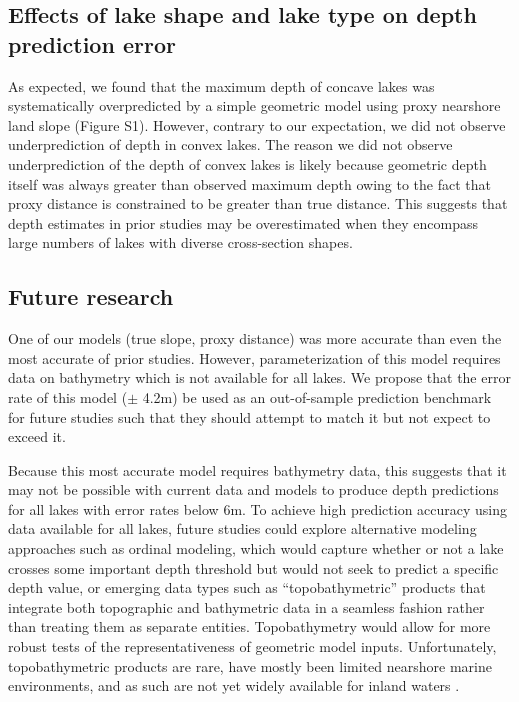 \documentclass[draft]{agujournal2019}
\begin{document}
\subsection{Effects of lake shape and lake type on depth prediction error}
\noindent
As expected, we found that the maximum depth of concave lakes was systematically overpredicted by a simple geometric model using proxy nearshore land slope (Figure S1). However, contrary to our expectation, we did not observe underprediction of depth in convex lakes. The reason we did not observe underprediction of the depth of convex lakes is likely because geometric depth itself was always greater than observed maximum depth owing to the fact that proxy distance is constrained to be greater than true distance. This suggests that depth estimates in prior studies may be overestimated when they encompass large numbers of lakes with diverse cross-section shapes.

\subsection{Future research}
\noindent
One of our models (true slope, proxy distance) was more accurate than even the most accurate of prior studies. However, parameterization of this model requires data on bathymetry which is not available for all lakes. We propose that the error rate of this model ($\pm$ 4.2m) be used as an out-of-sample prediction benchmark for future studies such that they should attempt to match it but not expect to exceed it.

Because this most accurate model requires bathymetry data, this suggests that it may not be possible with current data and models to produce depth predictions for all lakes with error rates below 6m. To achieve high prediction accuracy using data available for all lakes, future studies could explore alternative modeling approaches such as ordinal modeling, which would capture whether or not a lake crosses some important depth threshold but would not seek to predict a specific depth value, or emerging data types such as “topobathymetric” products that integrate both topographic and bathymetric data in a seamless fashion rather than treating them as separate entities. Topobathymetry would allow for more robust tests of the representativeness of geometric model inputs. Unfortunately, topobathymetric products are rare, have mostly been limited nearshore marine environments, and as such are not yet widely available for inland waters \cite{danielsonTopobathymetricElevationModel2016}.
\end{document}
